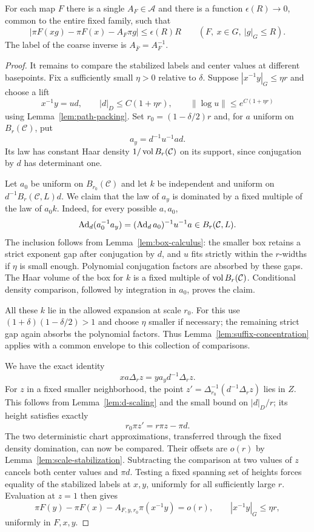 \begin{proposition}
\label{prop:uniform-sublinear}
For each map $F$ there is a single $A_F\in\mathcal A$ and there is
a function $\epsilon(R)\to0$, common to the entire fixed family,
such that
\begin{equation}
\label{eq:uniform-sublinear}
 \left|\pi F(xg)-\pi F(x)-A_F\pi g\right|
 \le\epsilon(R)R
 \qquad(F,\ x\in G,\ |g|_G\le R).
\end{equation}
The label of the coarse inverse is $A_{\bar F}=A_F^{-1}$.
\end{proposition}

\begin{proof}
It remains to compare the stabilized labels and center values at
different basepoints.  Fix a sufficiently small $\eta>0$ relative
to $\delta$.  Suppose $|x^{-1}y|_G\le\eta r$ and choose a lift
\[
 x^{-1}y=ud,\qquad
 |d|_D\le C(1+\eta r),\qquad
 \|\log u\|\le e^{C(1+\eta r)}
\]
using Lemma~\ref{lem:path-packing}.  Set $r_0=(1-\delta/2)r$ and,
for $a$ uniform on $B_r(\mathcal C)$, put
\[
 a_y=d^{-1}u^{-1}ad.
\]
Its law has constant Haar density $1/\operatorname{vol} B_r(\mathcal C)$ on
its support, since conjugation by $d$ has determinant one.

Let $a_0$ be uniform on $B_{r_0}(\mathcal C)$ and let $k$ be
independent and uniform on
$d^{-1}B_r(\mathcal C,L)d$.  We claim that the law of $a_y$
is dominated by a fixed multiple of the law of $a_0k$.
Indeed, for every possible $a,a_0$,
\[
 \operatorname{Ad}_d(a_0^{-1}a_y)=(\operatorname{Ad}_da_0)^{-1}u^{-1}a
 \in B_r(\mathcal C,L).
\]
The inclusion follows from Lemma~\ref{lem:box-calculus}:
the smaller box retains a strict exponent gap after conjugation
by $d$, and $u$ fits strictly within the $r$-widths if $\eta$
is small enough.  Polynomial conjugation factors are absorbed by
these gaps.  The Haar volume of the box for $k$ is a fixed
multiple of $\operatorname{vol} B_r(\mathcal C)$.  Conditional density comparison,
followed by integration in $a_0$, proves the claim.

All these $k$ lie in the allowed expansion at scale $r_0$.
For this use
$(1+\delta)(1-\delta/2)>1$ and choose $\eta$ smaller if necessary;
the remaining strict gap again absorbs the polynomial factors.
Thus Lemma~\ref{lem:suffix-concentration} applies with a common
envelope to this collection of comparisons.

We have the exact identity
\[
 xa\Delta_rz=ya_y d^{-1}\Delta_rz.
\]
For $z$ in a fixed smaller neighborhood, the point
$z'=\Delta_{r_0}^{-1}(d^{-1}\Delta_rz)$ lies in $Z$.
This follows from Lemma~\ref{lem:d-scaling} and the small bound
on $|d|_D/r$; its height satisfies exactly
\[
 r_0\pi z'=r\pi z-\pi d.
\]
The two deterministic chart approximations, transferred through
the fixed density domination, can now be compared.  Their offsets
are $o(r)$ by Lemma~\ref{lem:scale-stabilization}.  Subtracting the
comparison at two values of $z$ cancels both center values and
$\pi d$.  Testing a fixed spanning set of heights forces equality
of the stabilized labels at $x,y$, uniformly for all sufficiently
large $r$.  Evaluation at $z=1$ then gives
\[
 \pi F(y)-\pi F(x)-A_{F,y,r_0}\pi(x^{-1}y)=o(r),
 \qquad |x^{-1}y|_G\le\eta r,
\]
uniformly in $F,x,y$.


\end{proof}
